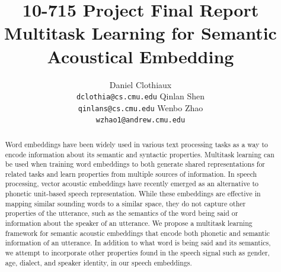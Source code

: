 \documentclass{article}
\title{10-715 Project Final Report \\
Multitask Learning for Semantic Acoustical Embedding  
}
\author{
  Daniel Clothiaux\\
  \texttt{dclothia@cs.cmu.edu}
  \And
  Qinlan Shen\\
  \texttt{qinlans@cs.cmu.edu}
  \And
  Wenbo Zhao\\
  \texttt{wzhao1@andrew.cmu.edu}
}
\begin{document}
\maketitle

\begin{abstract}
Word embeddings have been widely used in various text processing tasks as a way to encode information about its semantic and syntactic properties. Multitask learning can be used when training word embeddings to both generate shared representations for related tasks and learn properties from multiple sources of information. In speech processing, vector acoustic embeddings have recently emerged as an alternative to phonetic unit-based speech representation. While these embeddings are effective in mapping similar sounding words to a similar space, they do not capture other properties of the utterance, such as the semantics of the word being said or information about the speaker of an utterance. We propose a multitask learning framework for semantic acoustic embeddings that encode both phonetic and semantic information of an utterance. In addition to what word is being said and its semantics, we attempt to incorporate other properties found in the speech signal such as gender, age, dialect, and speaker identity, in our speech embeddings.
\end{abstract}
\end{document}
